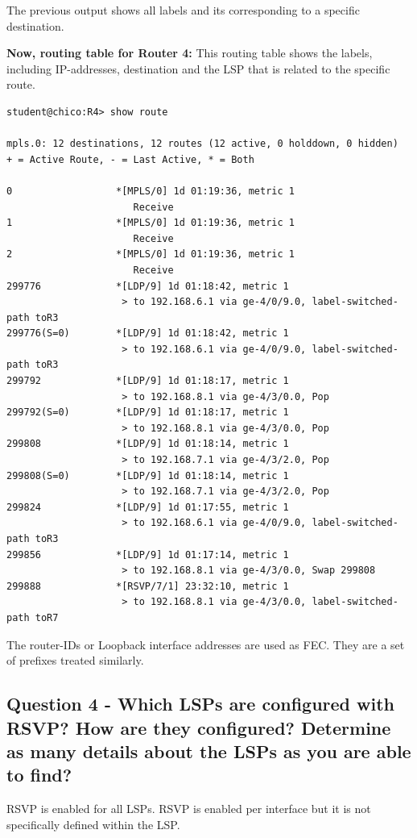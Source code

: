 \documentclass[a4paper]{article}
\begin{document}
The previous output shows all labels and its corresponding to a specific destination.


\textbf{Now, routing table for Router 4:} This routing table shows the labels, including IP-addresses, destination and the LSP that is related to the specific route.


\begin{verbatim}
student@chico:R4> show route 

mpls.0: 12 destinations, 12 routes (12 active, 0 holddown, 0 hidden)
+ = Active Route, - = Last Active, * = Both

0                  *[MPLS/0] 1d 01:19:36, metric 1
                      Receive
1                  *[MPLS/0] 1d 01:19:36, metric 1
                      Receive
2                  *[MPLS/0] 1d 01:19:36, metric 1
                      Receive
299776             *[LDP/9] 1d 01:18:42, metric 1
                    > to 192.168.6.1 via ge-4/0/9.0, label-switched-path toR3
299776(S=0)        *[LDP/9] 1d 01:18:42, metric 1
                    > to 192.168.6.1 via ge-4/0/9.0, label-switched-path toR3
299792             *[LDP/9] 1d 01:18:17, metric 1
                    > to 192.168.8.1 via ge-4/3/0.0, Pop      
299792(S=0)        *[LDP/9] 1d 01:18:17, metric 1
                    > to 192.168.8.1 via ge-4/3/0.0, Pop      
299808             *[LDP/9] 1d 01:18:14, metric 1
                    > to 192.168.7.1 via ge-4/3/2.0, Pop      
299808(S=0)        *[LDP/9] 1d 01:18:14, metric 1
                    > to 192.168.7.1 via ge-4/3/2.0, Pop      
299824             *[LDP/9] 1d 01:17:55, metric 1
                    > to 192.168.6.1 via ge-4/0/9.0, label-switched-path toR3
299856             *[LDP/9] 1d 01:17:14, metric 1
                    > to 192.168.8.1 via ge-4/3/0.0, Swap 299808
299888             *[RSVP/7/1] 23:32:10, metric 1
                    > to 192.168.8.1 via ge-4/3/0.0, label-switched-path toR7

\end{verbatim}

The router-IDs or Loopback interface addresses are used as FEC. They are a set of prefixes treated similarly. 


\subsection{Question 4 - Which LSPs are configured with RSVP? How are they configured? Determine as many details about the LSPs as you are able to find?}

RSVP is enabled for all LSPs. RSVP  is enabled per interface but it is not specifically defined within the LSP.
\end{document}
